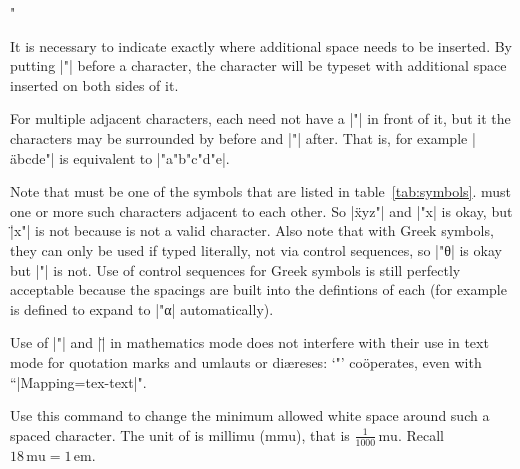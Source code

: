 \documentclass{ltxdockit}
\makeatletter
\def\topbottomrule{\noalign{\ifnum0=`}\fi
          \@aboverulesep=\aboverulesep
          \global\@belowrulesep=\belowrulesep
          \global\@thisruleclass=\@ne
          \@ifnextchar[{\@BTrule}{\@BTrule[\heavyrulewidth]}}
\makeatother
\begin{document}
\begin{ltxsyntax}

\item["]

It is necessary to indicate exactly where additional space needs to be inserted. By putting |"| before a character, the character will be typeset with additional space inserted on both sides of it.


For multiple adjacent characters, each need not have a |"| in front of it, but it the characters may be surrounded by  before and |"| after. That is, for example |\"abcde"| is equivalent to |"a"b"c"d"e|.

Note that  must be one of the symbols that are listed in table~\ref{tab:symbols}.  must one or more such characters adjacent to each other. So |\"xyz"| and |\sin"x| is okay, but |\"\sin x"| is not because  is not a valid character. Also note that with Greek symbols, they can only be used if typed literally, not via control sequences, so |\cos"θ| is okay but |\cos"\theta| is not. Use of control sequences for Greek symbols is still perfectly acceptable because the spacings are built into the defintions of each (for example  is defined to expand to |{"α}| automatically).

\begin{table}
\caption{All valid characters for use with \texttt" and \texttt{\textbackslash"}…\texttt".\label{tab:symbols}}
\end{table}
Use of |"| and |\"| in mathematics mode does not interfere with their use in text mode for quotation marks and umlauts or diæreses: ‘"’ co\"operates, even with {``|Mapping=tex-text|"}.


Use this command to change the minimum allowed white space around such a spaced character. The unit of  is millimu ($\mathrm{mmu}$), that is $\frac 1{1000}\,\mathrm{mu}$. Recall $18\,\mathrm{mu} = 1\,\mathrm{em}$.


\end{ltxsyntax}
\end{document}
